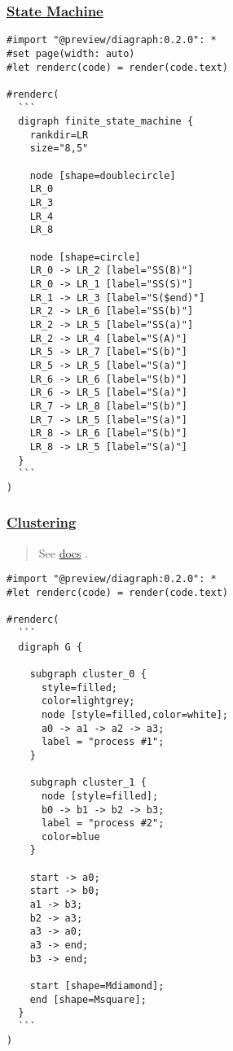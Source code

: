 \pandocbounded{}

\subsubsection{\texorpdfstring{\hyperref[state-machine]{State
Machine}}{State Machine}}\label{state-machine}

\begin{verbatim}
#import "@preview/diagraph:0.2.0": *
#set page(width: auto)
#let renderc(code) = render(code.text)

#renderc(
  ```
  digraph finite_state_machine {
    rankdir=LR
    size="8,5"

    node [shape=doublecircle]
    LR_0
    LR_3
    LR_4
    LR_8

    node [shape=circle]
    LR_0 -> LR_2 [label="SS(B)"]
    LR_0 -> LR_1 [label="SS(S)"]
    LR_1 -> LR_3 [label="S($end)"]
    LR_2 -> LR_6 [label="SS(b)"]
    LR_2 -> LR_5 [label="SS(a)"]
    LR_2 -> LR_4 [label="S(A)"]
    LR_5 -> LR_7 [label="S(b)"]
    LR_5 -> LR_5 [label="S(a)"]
    LR_6 -> LR_6 [label="S(b)"]
    LR_6 -> LR_5 [label="S(a)"]
    LR_7 -> LR_8 [label="S(b)"]
    LR_7 -> LR_5 [label="S(a)"]
    LR_8 -> LR_6 [label="S(b)"]
    LR_8 -> LR_5 [label="S(a)"]
  }
  ```
)
\end{verbatim}

\pandocbounded{}

\subsubsection{\texorpdfstring{\hyperref[clustering]{Clustering}}{Clustering}}\label{clustering}

\begin{quote}
See \href{http://www.graphviz.org/content/cluster}{docs} .
\end{quote}

\begin{verbatim}
#import "@preview/diagraph:0.2.0": *
#let renderc(code) = render(code.text)

#renderc(
  ```
  digraph G {

    subgraph cluster_0 {
      style=filled;
      color=lightgrey;
      node [style=filled,color=white];
      a0 -> a1 -> a2 -> a3;
      label = "process #1";
    }

    subgraph cluster_1 {
      node [style=filled];
      b0 -> b1 -> b2 -> b3;
      label = "process #2";
      color=blue
    }

    start -> a0;
    start -> b0;
    a1 -> b3;
    b2 -> a3;
    a3 -> a0;
    a3 -> end;
    b3 -> end;

    start [shape=Mdiamond];
    end [shape=Msquare];
  }
  ```
)
\end{verbatim}

